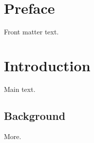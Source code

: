 \documentclass{book}
\begin{document}
\frontmatter
\chapter{Preface}
Front matter text.
\mainmatter
\chapter{Introduction}
Main text.
\section{Background}
More.
\end{document}
